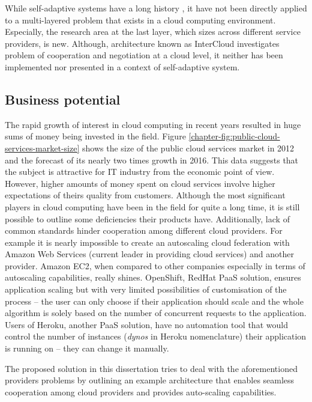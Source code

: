 While self-adaptive systems have a long history \cite{Mu04}, it have not been directly applied to a multi-layered problem that exists in a cloud computing environment. Especially, the research area at the last layer, which sizes across different service providers, is new. Although, architecture known as InterCloud \cite{BuRaCa10} investigates problem of cooperation and negotiation at a cloud level, it neither has been implemented nor presented in a context of self-adaptive system.

\subsection*{Business potential}
The rapid growth of interest in cloud computing in recent years resulted in huge sums of money being invested in the field. Figure \ref{chapter-fig:public-cloud-services-market-size} shows the size of the public cloud services market in 2012 and the forecast of its nearly two times growth in 2016. This data suggests that the subject is attractive for IT industry from the economic point of view. However, higher amounts of money spent on cloud services involve higher expectations of theirs quality from customers. Although the most significant players in cloud computing have been in the field for quite a long time, it is still possible to outline some deficiencies their products have. Additionally, lack of common standards hinder cooperation among different cloud providers. For example it is nearly impossible to create an autoscaling cloud federation with Amazon Web Services (current leader in providing cloud services\cite{GartnerMagicQuadrantSep2013}) and another provider. Amazon EC2, when compared to other companies especially in terms of autoscaling capabilities, really shines. OpenShift, RedHat PaaS solution, ensures application scaling but with very limited possibilities of customisation of the process -- the user can only choose if their application should scale and the whole algorithm is solely based on the number of concurrent requests to the application. Users of Heroku, another PaaS solution, have no automation tool that would control the number of instances (\emph{dynos} in Heroku nomenclature) their application is running on -- they can change it manually.

The proposed solution in this dissertation tries to deal with the aforementioned providers problems by outlining an example architecture that enables seamless cooperation among cloud providers and provides auto-scaling capabilities.

